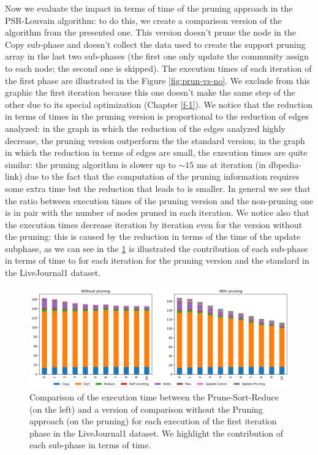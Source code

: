 \noindent Now we evaluate the impact in terms of time of the pruning approach in the PSR-Louvain algorithm: to do this, we create a comparison version of the algorithm from the presented one. This version doesn't prune the node in the Copy sub-phase and doesn't collect the data used to create the support pruning array in the last two sub-phases (the first one only update the community assign to each node; the second one is skipped). The execution times of each iteration of the first phase are illustrated in the Figure \ref{fig:prun-vs-no}. We exclude from this graphic the first iteration because this one doesn't make the same step of the other due to its special optimization (Chapter \ref{f-1}). We notice that the reduction in terms of times in the pruning version is proportional to the reduction of edges analyzed: in the graph in which the reduction of the edges analyzed highly decrease, the pruning version outperform the the standard version; in the graph in which the reduction in terms of edges are small, the execution times are quite similar: the pruning algorithm is slower up to $\sim15$ ms at iteration (in dbpedia-link) due to the fact that the computation of the pruning information requires some extra time but the reduction that leads to is smaller. In general we see that the ratio between execution times of the pruning version and the non-pruning one is in pair with the number of nodes pruned in each iteration. We notice also that the execution times decrease iteration by iteration even for the version without the pruning: this is caused by the reduction in terms of the time of the update subphase, as we can see in the \ref{fig:livejournal-comparison} is illustrated the contribution of each sub-phase in terms of time to for each iteration for the pruning version and the standard in the LiveJournal1 dataset.
\begin{figure}
	\centering
	\includegraphics[width=1\linewidth]{0-resources/livejournal-comparison-sort.png}
	\caption{Comparison of the execution time between the Prune-Sort-Reduce (on the left) and a version of comparison without the Pruning approach (on the pruning) for each execution of the first iteration phase in the LiveJournal1 dataset. We highlight the contribution of each sub-phase in terms of time.}
	\label{fig:livejournal-comparison}
\end{figure}
